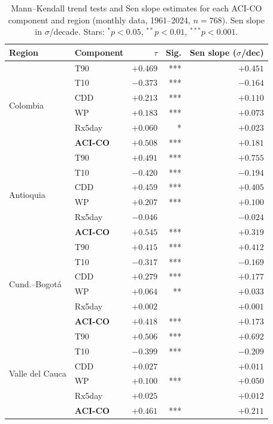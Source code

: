 \documentclass[12pt]{article}
\begin{document}
\begin{table}[H]
\centering\small
\renewcommand{\arraystretch}{1.2}
\setlength{\tabcolsep}{5pt}
\caption{Mann--Kendall trend tests and Sen slope estimates for each ACI-CO component and region (monthly data, 1961--2024, $n=768$). Sen slope in $\sigma$/decade. Stars: ${}^{*}p<0.05$, ${}^{**}p<0.01$, ${}^{***}p<0.001$.}
\label{tab:mk_trends}
\begin{tabular}{@{}llrrr@{}}
\toprule
Region & Component & $\tau$ & Sig. & Sen slope ($\sigma$/dec) \\
\midrule
\multirow{6}{*}{Colombia}
  & T90            & $+0.469$ & *** & $+0.451$ \\
  & T10            & $-0.373$ & *** & $-0.164$ \\
  & CDD            & $+0.213$ & *** & $+0.110$ \\
  & WP             & $+0.183$ & *** & $+0.073$ \\
  & Rx5day         & $+0.060$ & *   & $+0.023$ \\
  & \textbf{ACI-CO} & $+0.508$ & *** & $+0.181$ \\
\midrule
\multirow{6}{*}{Antioquia}
  & T90            & $+0.491$ & *** & $+0.755$ \\
  & T10            & $-0.420$ & *** & $-0.194$ \\
  & CDD            & $+0.459$ & *** & $+0.405$ \\
  & WP             & $+0.207$ & *** & $+0.100$ \\
  & Rx5day         & $-0.046$ &     & $-0.024$ \\
  & \textbf{ACI-CO} & $+0.545$ & *** & $+0.319$ \\
\midrule
\multirow{6}{*}{Cund.--Bogot\'a}
  & T90            & $+0.415$ & *** & $+0.412$ \\
  & T10            & $-0.317$ & *** & $-0.169$ \\
  & CDD            & $+0.279$ & *** & $+0.177$ \\
  & WP             & $+0.064$ & **  & $+0.033$ \\
  & Rx5day         & $+0.002$ &     & $+0.001$ \\
  & \textbf{ACI-CO} & $+0.418$ & *** & $+0.173$ \\
\midrule
\multirow{6}{*}{Valle del Cauca}
  & T90            & $+0.506$ & *** & $+0.692$ \\
  & T10            & $-0.399$ & *** & $-0.209$ \\
  & CDD            & $+0.027$ &     & $+0.011$ \\
  & WP             & $+0.100$ & *** & $+0.050$ \\
  & Rx5day         & $+0.025$ &     & $+0.012$ \\
  & \textbf{ACI-CO} & $+0.461$ & *** & $+0.211$ \\
\bottomrule
\end{tabular}
\end{table}
\end{document}
